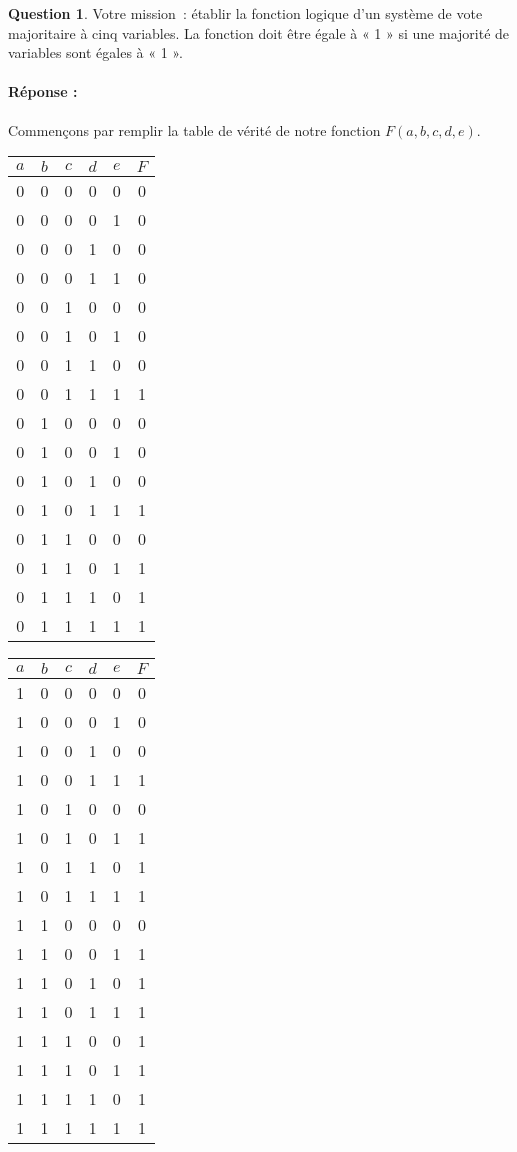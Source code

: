\documentclass[11pt,a4paper]{article}
\theoremstyle{definition}%
\newtheorem{Q}{Question}[] %
\newcommand{\reponse}[1]{%
	\ifthenelse {\boolean{corrige}} {\paragraph{Réponse :} \color{darkblue}   #1\color{black}} {}
 }
\begin{document}
\begin{Q}
Votre mission~: établir la fonction logique d'un système de vote majoritaire à cinq variables.
La fonction doit être égale à « 1 » si une majorité de variables sont égales à « 1 ».

\reponse{
	Commençons par remplir la table de vérité de notre fonction $F(a,b,c,d,e)$.
	\begin{center}
		\begin{tabular}{|c|c|c|c|c|c|} \hline
		$a$ & $b$ & $c$ & $d$ & $e$ & $F$ \\ \hline
		0 & 0 & 0 & 0 & 0 & 0 \\ \hline
		0 & 0 & 0 & 0 & 1 & 0 \\ \hline
		0 & 0 & 0 & 1 & 0 & 0 \\ \hline
		0 & 0 & 0 & 1 & 1 & 0 \\ \hline
		0 & 0 & 1 & 0 & 0 & 0 \\ \hline
		0 & 0 & 1 & 0 & 1 & 0 \\ \hline
		0 & 0 & 1 & 1 & 0 & 0 \\ \hline
		0 & 0 & 1 & 1 & 1 & 1 \\ \hline
		0 & 1 & 0 & 0 & 0 & 0 \\ \hline
		0 & 1 & 0 & 0 & 1 & 0 \\ \hline
		0 & 1 & 0 & 1 & 0 & 0 \\ \hline
		0 & 1 & 0 & 1 & 1 & 1 \\ \hline
		0 & 1 & 1 & 0 & 0 & 0 \\ \hline
		0 & 1 & 1 & 0 & 1 & 1 \\ \hline
		0 & 1 & 1 & 1 & 0 & 1 \\ \hline
		0 & 1 & 1 & 1 & 1 & 1 \\ \hline
		\end{tabular}
		\begin{tabular}{|c|c|c|c|c|c|} \hline
		$a$ & $b$ & $c$ & $d$ & $e$ & $F$ \\ \hline
		1 & 0 & 0 & 0 & 0 & 0 \\ \hline
		1 & 0 & 0 & 0 & 1 & 0 \\ \hline
		1 & 0 & 0 & 1 & 0 & 0 \\ \hline
		1 & 0 & 0 & 1 & 1 & 1 \\ \hline
		1 & 0 & 1 & 0 & 0 & 0 \\ \hline
		1 & 0 & 1 & 0 & 1 & 1 \\ \hline
		1 & 0 & 1 & 1 & 0 & 1 \\ \hline
		1 & 0 & 1 & 1 & 1 & 1 \\ \hline
		1 & 1 & 0 & 0 & 0 & 0 \\ \hline
		1 & 1 & 0 & 0 & 1 & 1 \\ \hline
		1 & 1 & 0 & 1 & 0 & 1 \\ \hline
		1 & 1 & 0 & 1 & 1 & 1 \\ \hline
		1 & 1 & 1 & 0 & 0 & 1 \\ \hline
		1 & 1 & 1 & 0 & 1 & 1 \\ \hline
		1 & 1 & 1 & 1 & 0 & 1 \\ \hline
		1 & 1 & 1 & 1 & 1 & 1 \\ \hline
		\end{tabular}
	\end{center}


}
\end{Q}
\end{document}

